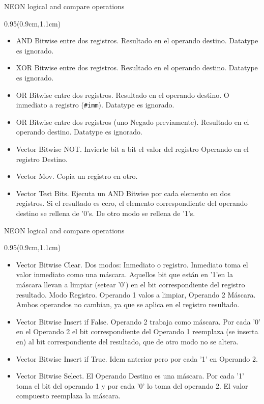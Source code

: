\begin{frame}{NEON logical and compare operations}
 \begin{textblock*}{0.95\textwidth}(0.9cm,1.1cm)
  \begin{itemize}\justifying
   \item [VAND] AND Bitwise entre dos registros. Resultado en el operando destino. Datatype es ignorado.
   \item [VEOR] XOR Bitwise entre dos registros. Resultado en el operando destino. Datatype es ignorado.
   \item [VORR] OR Bitwise entre dos registros. Resultado en el operando destino. O inmediato a registro (\texttt{\#imm}). Datatype es ignorado.
   \item [VORN] OR Bitwise entre dos registros (uno Negado previamente). Resultado en el operando destino. Datatype es ignorado.
   \item [VMVN] Vector Bitwise NOT. Invierte bit a bit el valor del registro Operando en el registro Destino.
   \item [VMOV] Vector Mov. Copia un registro en otro.
   \item [VTST] Vector Test Bits. Ejecuta un AND Bitwise por cada elemento en dos registros. Si el resultado es cero, el elemento correspondiente del operando destino se rellena de '0's. De otro modo se rellena de '1's.
  \end{itemize}
 \end{textblock*}
\end{frame}

\begin{frame}{NEON logical and compare operations}
 \begin{textblock*}{0.95\textwidth}(0.9cm,1.1cm)
  \begin{itemize}\justifying
   \item [VBIC] Vector Bitwise Clear. Dos modos: Inmediato o registro. Inmediato toma el valor inmediato como una máscara. Aquellos bit que están en '1'en la máscara llevan a limpiar (setear '0') en el bit correspondiente del registro resultado. Modo Registro. Operando 1 valos a limpiar, Operando 2 Máscara. Ambos operandos no cambian, ya que se aplica en el registro resultado.
   \item [VBIF] Vector Bitwise Insert if False. Operando 2 trabaja como máscara. Por cada '0' en el Operando 2 el bit correspondiente del Operando 1 reemplaza (se inserta en) al bit correspondiente del resultado, que de otro modo no se altera.
   \item [VBIF] Vector Bitwise Insert if True. Idem anterior pero por cada '1' en Operando 2.
   \item [VBSL] Vector Bitwise Select. El Operando Destino es una máscara. Por cada '1' toma el bit del operando 1 y por cada '0' lo toma del operando 2. El valor compuesto reemplaza la máscara.
  \end{itemize}
 \end{textblock*}
\end{frame}

